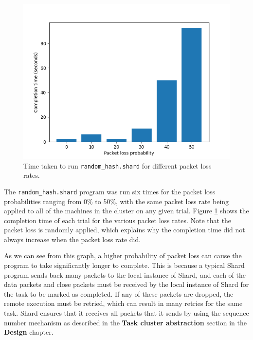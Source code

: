\documentclass[oneside]{report}
\begin{document}
\begin{figure}[h]
  \begin{center}
    \includegraphics[scale=0.9]{img/experiments/e9_1620960581241.png}
    \caption{Time taken to run \texttt{random\_hash.shard} for different packet loss rates.}
    \label{fig:packetlosshash}
  \end{center}
\end{figure}

The \texttt{random\_hash.shard} program was run six times for the packet loss probabilities ranging from 0\% to 50\%, with the same packet loss rate being applied to all of the machines in the cluster on any given trial.
Figure \ref{fig:packetlosshash} shows the completion time of each trial for the various packet loss rates.
Note that the packet loss is randomly applied, which explains why the completion time did not always increase when the packet loss rate did.

As we can see from this graph, a higher probability of packet loss can cause the program to take significantly longer to complete.
This is because a typical Shard program sends back many packets to the local instance of Shard, and each of the data packets and close packets must be received by the local instance of Shard for the task to be marked as completed.
If any of these packets are dropped, the remote execution must be retried, which can result in many retries for the same task.
Shard ensures that it receives all packets that it sends by using the sequence number mechanism as described in the \textbf{Task cluster abstraction} section in the \textbf{Design} chapter.
\end{document}
